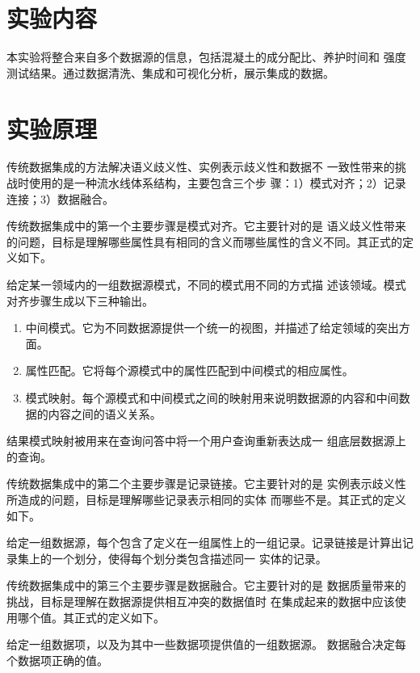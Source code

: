 \section{实验内容}
本实验将整合来自多个数据源的信息，包括混凝土的成分配比、养护时间和
强度测试结果。通过数据清洗、集成和可视化分析，展示集成的数据。
\section{实验原理}
传统数据集成的方法解决语义歧义性、实例表示歧义性和数据不
一致性带来的挑战时使用的是一种流水线体系结构，主要包含三个步
骤：1）模式对齐；2）记录连接；3）数据融合。

传统数据集成中的第一个主要步骤是模式对齐。它主要针对的是
语义歧义性带来的问题，目标是理解哪些属性具有相同的含义而哪些属性的含义不同。其正式的定义如下。 

给定某一领域内的一组数据源模式，不同的模式用不同的方式描
述该领域。模式对齐步骤生成以下三种输出。 
\begin{enumerate}
    \item 中间模式。它为不同数据源提供一个统一的视图，并描述了给定领域的突出方面。
    \item 属性匹配。它将每个源模式中的属性匹配到中间模式的相应属性。
    \item 模式映射。每个源模式和中间模式之间的映射用来说明数据源的内容和中间数据的内容之间的语义关系。
\end{enumerate}

结果模式映射被用来在查询问答中将一个用户查询重新表达成一
组底层数据源上的查询。

传统数据集成中的第二个主要步骤是记录链接。它主要针对的是
实例表示歧义性所造成的问题，目标是理解哪些记录表示相同的实体
而哪些不是。其正式的定义如下。

给定一组数据源，每个包含了定义在一组属性上的一组记录。记录链接是计算出记录集上的一个划分，使得每个划分类包含描述同一
实体的记录。 

传统数据集成中的第三个主要步骤是数据融合。它主要针对的是
数据质量带来的挑战，目标是理解在数据源提供相互冲突的数据值时
在集成起来的数据中应该使用哪个值。其正式的定义如下。 

给定一组数据项，以及为其中一些数据项提供值的一组数据源。
数据融合决定每个数据项正确的值。 